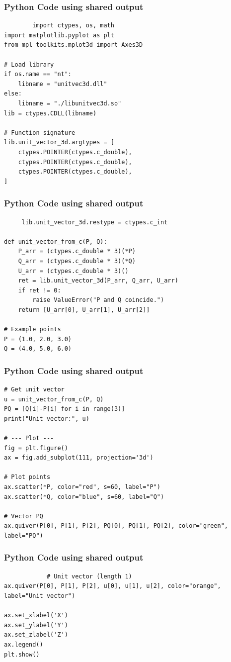 \documentclass{beamer}
\begin{document}
\begin{frame}[fragile]
	\frametitle{Python Code using shared output}
	\begin{lstlisting}
		import ctypes, os, math
import matplotlib.pyplot as plt
from mpl_toolkits.mplot3d import Axes3D

# Load library
if os.name == "nt":
    libname = "unitvec3d.dll"
else:
    libname = "./libunitvec3d.so"
lib = ctypes.CDLL(libname)

# Function signature
lib.unit_vector_3d.argtypes = [
    ctypes.POINTER(ctypes.c_double),
    ctypes.POINTER(ctypes.c_double),
    ctypes.POINTER(ctypes.c_double),
]
	\end{lstlisting}
\end{frame}
\begin{frame}[fragile]
	\frametitle{Python Code using shared output}
	\begin{lstlisting}	
     lib.unit_vector_3d.restype = ctypes.c_int

def unit_vector_from_c(P, Q):
    P_arr = (ctypes.c_double * 3)(*P)
    Q_arr = (ctypes.c_double * 3)(*Q)
    U_arr = (ctypes.c_double * 3)()
    ret = lib.unit_vector_3d(P_arr, Q_arr, U_arr)
    if ret != 0:
        raise ValueError("P and Q coincide.")
    return [U_arr[0], U_arr[1], U_arr[2]]

# Example points
P = (1.0, 2.0, 3.0)
Q = (4.0, 5.0, 6.0)

	\end{lstlisting}
\end{frame}
\begin{frame}[fragile]
	\frametitle{Python Code using shared output}
	\begin{lstlisting}
# Get unit vector
u = unit_vector_from_c(P, Q)
PQ = [Q[i]-P[i] for i in range(3)]
print("Unit vector:", u)

# --- Plot ---
fig = plt.figure()
ax = fig.add_subplot(111, projection='3d')

# Plot points
ax.scatter(*P, color="red", s=60, label="P")
ax.scatter(*Q, color="blue", s=60, label="Q")

# Vector PQ
ax.quiver(P[0], P[1], P[2], PQ[0], PQ[1], PQ[2], color="green", label="PQ")

	\end{lstlisting}
\end{frame}
\begin{frame}[fragile]
        \frametitle{Python Code using shared output}
        \begin{lstlisting}
            # Unit vector (length 1)
ax.quiver(P[0], P[1], P[2], u[0], u[1], u[2], color="orange", label="Unit vector")

ax.set_xlabel('X')
ax.set_ylabel('Y')
ax.set_zlabel('Z')
ax.legend()
plt.show()
        \end{lstlisting}
\end{frame}
\end{document}
